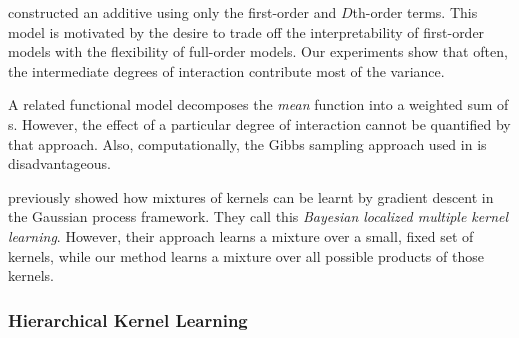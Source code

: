 \citet{plate1999accuracy} constructed an additive \gp{} using only the first-order and $D$th-order terms.
This model is motivated by the desire to trade off the interpretability of first-order models with the flexibility of full-order models.
Our experiments show that often, the intermediate degrees of interaction contribute most of the variance.

A related functional \ANOVA{} \gp{} model \citep{kaufman2010bayesian} decomposes the \emph{mean} function into a weighted sum of \gp{}s.
However, the effect of a particular degree of interaction cannot be quantified by that approach.
Also, computationally, the Gibbs sampling approach used in \citep{kaufman2010bayesian} is disadvantageous.

\citet{christoudias2009bayesian} previously showed how mixtures of kernels can be learnt by gradient descent in the Gaussian process framework.
They call this \emph{Bayesian localized multiple kernel learning}.
However, their approach learns a mixture over a small, fixed set of kernels, while our method learns a mixture over all possible products of those kernels.


\subsubsection{Hierarchical Kernel Learning}

